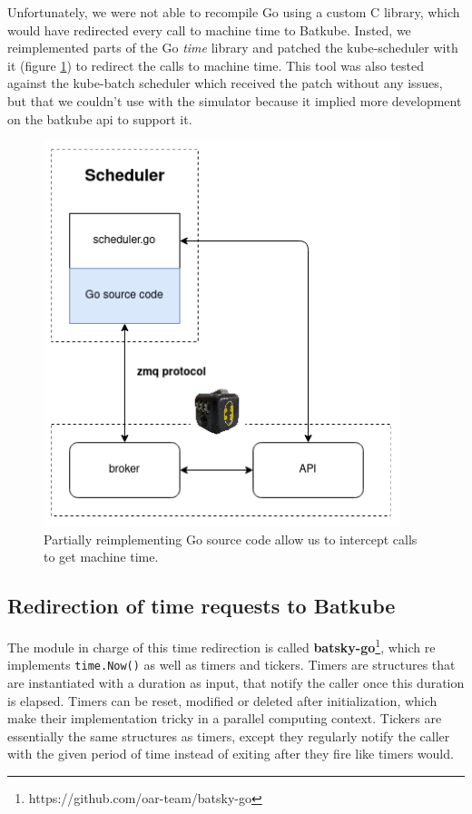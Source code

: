 Unfortunately, we were not able to recompile Go using a custom C library, which
would have redirected every call to machine time to Batkube. Insted, we
reimplemented parts of the Go \textit{time} library and patched the
kube-scheduler with it (figure \ref{fig:patch-time}) to redirect the calls to
machine time.  This tool was also tested against the kube-batch scheduler which
received the patch without any issues, but that we couldn't use with the
simulator because it implied more development on the batkube api to support it.

\begin{figure}[]
	\centering
	\includegraphics[scale=0.75]{imgs/time-hijack-Go.png}
	\caption{Partially reimplementing Go source code allow us to intercept calls to get machine time.}
	\label{fig:patch-time}
\end{figure}

\subsection{Redirection of time requests to Batkube}

The module in charge of this time redirection is called
\textbf{batsky-go}\footnote{https://github.com/oar-team/batsky-go}, which re
implements \texttt{time.Now()} as well as timers and tickers. Timers are
structures that are instantiated with a duration as input, that notify the
caller once this duration is elapsed. Timers can be reset, modified or deleted
after initialization, which make their implementation tricky in a parallel
computing context. Tickers are essentially the same structures as timers,
except they regularly notify the caller with the given period of time instead
of exiting after they fire like timers would.

